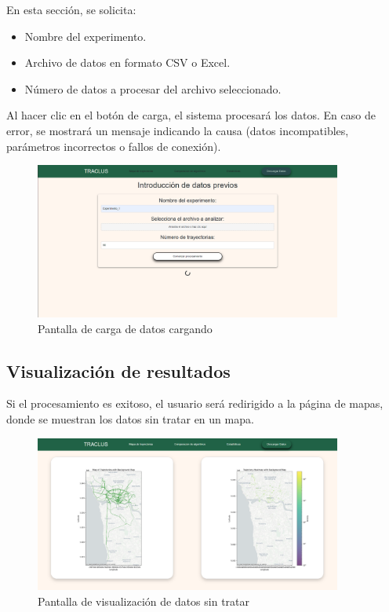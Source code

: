 En esta sección, se solicita:

\begin{itemize}
    \item Nombre del experimento.
    \item Archivo de datos en formato CSV o Excel.
    \item Número de datos a procesar del archivo seleccionado.
\end{itemize}

Al hacer clic en el botón de carga, el sistema procesará los datos. En caso de error, se mostrará un mensaje indicando la causa (datos incompatibles, parámetros incorrectos o fallos de conexión).

\begin{figure}[H]
    \centering
    \includegraphics[width=0.9\textwidth]{img/webpage/load_page_loading.png}
    \caption{Pantalla de carga de datos cargando}
\end{figure}

\subsection{Visualización de resultados}

Si el procesamiento es exitoso, el usuario será redirigido a la página de mapas, donde se muestran los datos sin tratar en un mapa.

\begin{figure}[H]
    \centering
    \includegraphics[width=0.9\textwidth]{img/webpage/Map_page.png}
    \caption{Pantalla de visualización de datos sin tratar}
\end{figure}

